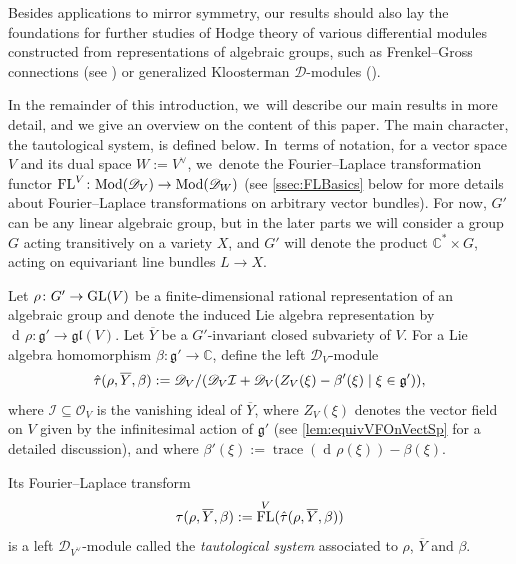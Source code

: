 \documentclass[JEP,XML,SOM,Unicode,published]{cedram}
\let\mathds\mathbb
\newcommand{\dC}{{\mathds C}}\let\C\dC
\newcommand{\cD}{\mathscr{D}}
\newcommand{\cI}{\mathcal{I}}
\newcommand{\cO}{\mathcal{O}}\let\O\cO
\newcommand{\frg}{\mathfrak{g}}
\newcommand{\frgl}{\mathfrak{gl}}
\DeclareMathOperator{\differential}{d\!}
\DeclareMathOperator{\FL}{\textup{FL}}
\DeclareMathOperator{\GL}{\textup{GL}}
\DeclareMathOperator{\trace}{trace}
\let\originalleft\left
\let\originalright\right
\renewcommand{\left}{\mathopen{}\mathclose\bgroup\originalleft}
\renewcommand{\right}{\aftergroup\egroup\originalright}
\newcommand\defstyle[1]{\emph{#1}}
\begin{document}
Besides applications to
mirror symmetry, our results should also lay the foundations for
further studies of Hodge theory of various differential modules
constructed from representations of algebraic groups, such as
Frenkel--Gross connections (see \cite{FrenkelGross}) or generalized
Kloosterman $\cD$\nobreakdash-mod\-ules (\cite{HeinlothNgoYun}).

In the remainder of this introduction, we~will describe our main results in more detail, and we give an overview on the content of this paper. The main character, the tautological system, is defined below. In~terms of notation, for a vector space $V$ and its dual space $W:=V^\vee$, we~denote the Fourier--Laplace transformation functor
$\FL^V\colon \textup{Mod}(\mathscr{D}_V)\to\textup{Mod}(\mathscr{D}_W)$ (see \cref{ssec:FLBasics} below for more details about Fourier--Laplace transformations on arbitrary vector bundles). For now, $G'$ can be any linear algebraic group, but in the
later parts we will consider a group $G$ acting transitively on a variety $X$, and $G'$ will denote the
product $\dC^*\times G$, acting on equivariant line bundles $L\to X$.

\begin{dfn} \label{def:tautSys}
Let $\rho \colon G' \to \GL(V)$ be a finite-dimensional rational representation of an algebraic group and denote the induced Lie algebra representation by $\differential\rho \colon \frg' \to \frgl(V)$. Let $\overline{Y}$ be a $G'$-invariant closed subvariety of $V$. For a Lie algebra homomorphism $\beta \colon \frg' \to \C$, define the left $\mathscr{D}_V$\nobreakdash-mod\-ule
\begin{equation}\label{eq:tau_hat}
\hat{\tau}(\rho, \overline{Y}, \beta) := \mathscr{D}_{V}/\left(\mathscr{D}_{V} \cI + \mathscr{D}_{V}\left(Z_V(\xi)-\beta'(\xi) \mid \xi \in \frg'\right)\right),
\end{equation}
where $\cI \subseteq \cO_V$ is the vanishing ideal of $\overline{Y}$, where
$Z_V(\xi)$ denotes the vector field on $V$ given by the infinitesimal action of $\frg'$ (see \cref{lem:equivVFOnVectSp} for a detailed discussion), and where $\beta'(\xi) := \trace(\differential\rho(\xi))-\beta(\xi)$.

Its Fourier--Laplace transform
\begin{equation}\label{eq:tau}
\tau(\rho, \overline{Y}, \beta) := \FL^V(\hat\tau(\rho, \overline{Y}, \beta))
\end{equation}
is a left $\mathscr{D}_{V^\vee}$\nobreakdash-mod\-ule called the \defstyle{tautological system} associated to $\rho$, $\overline{Y}$ and $\beta$.
\end{dfn}
\end{document}
